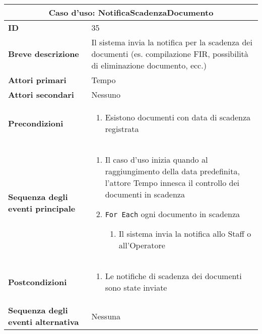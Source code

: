 \documentclass[a4paper]{report}
\begin{document}
\clearpage
\begin{table}[H]
\vspace*{-0cm}
\renewcommand{\arraystretch}{1.9}
\begin{tabular}{|p{3.9cm}|p{9.9cm}|}
\hline
\multicolumn{2}{|c|}{\textbf{Caso d’uso: NotificaScadenzaDocumento}} \\ \hline
	\textbf{ID} & 35 \\ \hline
	\textbf{Breve descrizione} & Il sistema invia la notifica per la scadenza dei documenti (es. compilazione FIR, possibilità di eliminazione documento, ecc.) \\ \hline
	\textbf{Attori primari} & Tempo \\ \hline
	\textbf{Attori secondari} & Nessuno \\ \hline
	\textbf{Precondizioni} & \begin{enumerate}[leftmargin=14pt,label=\arabic*.,labelsep=0.5em,topsep=0pt,partopsep=0pt,parsep=0pt,itemsep=0pt]
        \item Esistono documenti con data di scadenza registrata
    \end{enumerate} \\ \hline
	\textbf{Sequenza degli eventi principale} & 
\begin{enumerate}[leftmargin=14pt,label=\arabic*.,labelsep=0.5em,topsep=0pt,partopsep=0pt,parsep=0pt,itemsep=0pt]
    \item Il caso d’uso inizia quando al raggiungimento della data predefinita, l’attore Tempo innesca il controllo dei documenti in scadenza
    \item \texttt{For Each} ogni documento in scadenza
    \begin{enumerate}[label=\arabic{enumi}.\arabic*.,leftmargin=22pt,labelsep=0.5em,topsep=0pt,partopsep=0pt,parsep=0pt,itemsep=0pt]
        \item Il sistema invia la notifica allo Staff o all’Operatore
    \end{enumerate}
\end{enumerate}\\ \hline
	\textbf{Postcondizioni} & \begin{enumerate}[label=\arabic*.,leftmargin=14pt,labelsep=0.5em,topsep=0pt,partopsep=0pt,parsep=0pt,itemsep=0pt]
        \item Le notifiche di scadenza dei documenti sono state inviate
    \end{enumerate} \\ \hline
	\textbf{Sequenza degli eventi alternativa} & Nessuna \\ \hline
\end{tabular}
\end{table}
\end{document}
